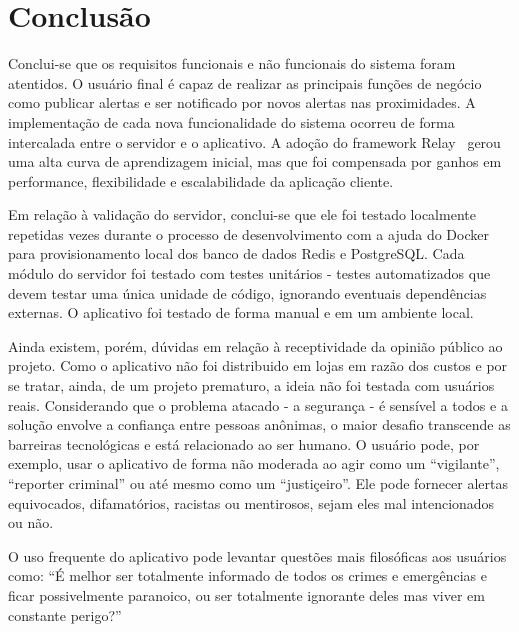 \chapter{Conclusão}

Conclui-se que os requisitos funcionais e não funcionais do sistema foram atentidos. O usuário final é capaz de realizar as principais funções de negócio como publicar alertas e ser notificado por novos alertas nas proximidades. A implementação de cada nova funcionalidade do sistema ocorreu de forma intercalada entre o servidor e o aplicativo. A adoção do framework Relay~\cite{relay} gerou uma alta curva de aprendizagem inicial, mas que foi compensada por ganhos em performance, flexibilidade e escalabilidade da aplicação cliente.

Em relação à validação do servidor, conclui-se que ele foi testado localmente repetidas vezes durante o processo de desenvolvimento com a ajuda do Docker~\cite{docker} para provisionamento local dos banco de dados Redis e PostgreSQL. Cada módulo do servidor foi testado com testes unitários - testes automatizados que devem testar uma única unidade de código, ignorando eventuais dependências externas. O aplicativo foi testado de forma manual e em um ambiente local.

Ainda existem, porém, dúvidas em relação à receptividade da opinião público ao projeto. Como o aplicativo não foi distribuido em lojas em razão dos custos e por se tratar, ainda, de um projeto prematuro, a ideia não foi testada com usuários reais. Considerando que o problema atacado - a segurança - é sensível a todos e a solução envolve a confiança entre pessoas anônimas, o maior desafio transcende as barreiras tecnológicas e está relacionado ao ser humano. O usuário pode, por exemplo, usar o aplicativo de forma não moderada ao agir como um ``vigilante'', ``reporter criminal'' ou até mesmo como um ``justiçeiro''. Ele pode fornecer alertas equivocados, difamatórios, racistas ou mentirosos, sejam eles mal intencionados ou não.

O uso frequente do aplicativo pode levantar questões mais filosóficas aos usuários como: ``É melhor ser totalmente informado de todos os crimes e emergências e ficar possivelmente paranoico, ou ser totalmente ignorante deles mas viver em constante perigo?''

